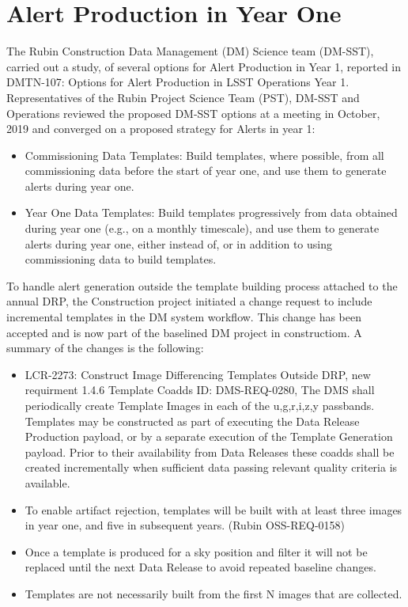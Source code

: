 \section{Alert Production in Year One}
\label{sec:pp}

The Rubin Construction Data Management (DM) Science team (DM-SST), carried out a study, of several options for Alert Production in Year 1, reported in DMTN-107: Options for Alert Production in LSST Operations Year 1.  
Representatives of the Rubin Project Science Team (PST), DM-SST and Operations reviewed the proposed DM-SST options at a meeting in October, 2019 and converged on a proposed strategy for Alerts in year 1:

\begin{itemize}
\item Commissioning Data Templates: Build templates, where possible, from all commissioning data before the start of year one, and use them to generate alerts during year one. 
\item Year One Data Templates: Build templates progressively from data obtained during year one (e.g., on a monthly timescale), and use them to generate alerts during year one, either instead of, or in addition to using commissioning data to build templates.
\end{itemize}

To handle alert generation outside the template building process attached to the annual DRP, the Construction project initiated a change request to include incremental templates in the DM system workflow. This change has been accepted and is now part of the baselined DM project in constructiom. A summary of the changes is the following:

\begin{itemize} 
\item LCR-2273: Construct Image Differencing Templates Outside DRP, new requirment 1.4.6 Template Coadds ID: DMS-REQ-0280, The DMS shall periodically create Template Images in each of the u,g,r,i,z,y passbands. Templates may be constructed as part of executing the Data Release Production payload, or by a separate execution of the Template Generation payload. Prior to their availability from Data Releases these coadds shall be created incrementally when sufficient data passing relevant quality criteria is available. 
\item To enable artifact rejection, templates will be built with at least three images in year one, and five in subsequent years.  (Rubin OSS-REQ-0158)
\item Once a template is produced for a sky position and filter it will not be replaced until the next Data Release to avoid repeated baseline changes.
\item Templates are not necessarily built from the first N images that are collected.
\end{itemize}


